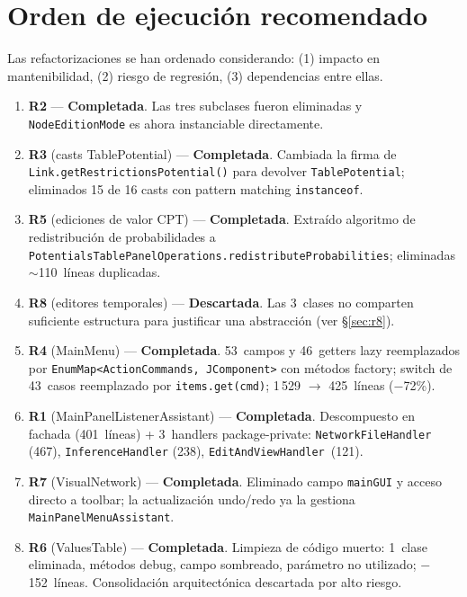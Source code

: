 \documentclass[12pt,a4paper]{article}
\newcommand{\code}[1]{\texttt{#1}}
\newcommand{\clase}[1]{\texttt{#1}}
\newcommand{\metodo}[1]{\texttt{#1}}
\newcommand{\good}[1]{\textcolor{codegreen}{\textbf{#1}}}
\newcommand{\warn}[1]{\textcolor{warnorange}{\textbf{#1}}}
\begin{document}
\section{Orden de ejecución recomendado}
\label{sec:orden}

Las refactorizaciones se han ordenado considerando: (1) impacto en
mantenibilidad, (2) riesgo de regresión, (3) dependencias entre
ellas.

\begin{enumerate}
  \item \textbf{R2} --- \good{Completada}. Las tres subclases fueron
        eliminadas y \clase{NodeEditionMode} es ahora instanciable
        directamente.
  \item \textbf{R3} (casts TablePotential) --- \good{Completada}.
        Cambiada la firma de \metodo{Link.getRestrictionsPotential()}
        para devolver \clase{TablePotential}; eliminados 15 de 16
        casts con pattern matching \code{instanceof}.
  \item \textbf{R5} (ediciones de valor CPT) --- \good{Completada}.
        Extraído algoritmo de redistribución de probabilidades a
        \metodo{PotentialsTablePanelOperations.redistributeProbabilities};
        eliminadas $\sim$110~líneas duplicadas.
  \item \textbf{R8} (editores temporales) --- \warn{Descartada}.
        Las 3~clases no comparten suficiente estructura para
        justificar una abstracción (ver \S\ref{sec:r8}).
  \item \textbf{R4} (MainMenu) --- \good{Completada}.
        53~campos y 46~getters lazy reemplazados por
        \code{EnumMap<ActionCommands, JComponent>} con métodos factory;
        switch de 43~casos reemplazado por \code{items.get(cmd)};
        1\,529 $\to$ 425~líneas ($-$72\%).
  \item \textbf{R1} (MainPanelListenerAssistant) --- \good{Completada}.
        Descompuesto en fachada (401~líneas) + 3~handlers
        package-private: \clase{NetworkFileHandler} (467),
        \clase{InferenceHandler} (238), \clase{EditAndViewHandler}~(121).
  \item \textbf{R7} (VisualNetwork) --- \good{Completada}.
        Eliminado campo \code{mainGUI} y acceso directo a toolbar;
        la actualización undo/redo ya la gestiona
        \clase{MainPanelMenuAssistant}.
  \item \textbf{R6} (ValuesTable) --- \good{Completada}.
        Limpieza de código muerto: 1~clase eliminada, métodos debug,
        campo sombreado, parámetro no utilizado; $-$152~líneas.
        Consolidación arquitectónica descartada por alto riesgo.
\end{enumerate}
\end{document}
